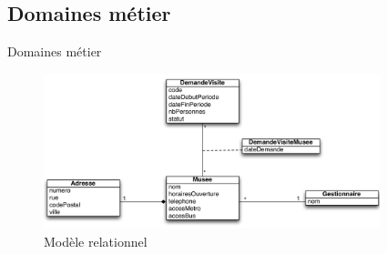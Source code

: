 \AntoineSpeak
\subsection{Domaines métier}
\begin{frame}{Domaines métier}
	\begin{figure}
		\centering
		\includegraphics[width=9.75cm]{screens/database.png}
		\caption{Modèle relationnel}
	\end{figure}
\end{frame}
